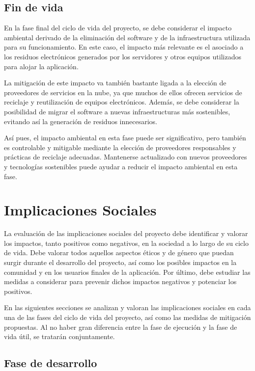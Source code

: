 \subsection{Fin de vida}

En la fase final del ciclo de vida del proyecto, se debe considerar el impacto ambiental derivado de la eliminación del software y de la infraestructura utilizada para su funcionamiento. En este caso, el impacto más relevante es el asociado a los residuos electrónicos generados por los servidores y otros equipos utilizados para alojar la aplicación.

La mitigación de este impacto va también bastante ligada a la elección de proveedores de servicios en la nube, ya que muchos de ellos ofrecen servicios de reciclaje y reutilización de equipos electrónicos. Además, se debe considerar la posibilidad de migrar el software a nuevas infraestructuras más sostenibles, evitando así la generación de residuos innecesarios.

Así pues, el impacto ambiental en esta fase puede ser significativo, pero también es controlable y mitigable mediante la elección de proveedores responsables y prácticas de reciclaje adecuadas. Mantenerse actualizado con nuevos proveedores y tecnologías sostenibles puede ayudar a reducir el impacto ambiental en esta fase.

\section{Implicaciones Sociales}
\label{as:sec:sociales}

La evaluación de las implicaciones sociales del proyecto debe identificar y valorar los impactos, tanto positivos como negativos, en la sociedad a lo largo de su ciclo de vida. Debe valorar todos aquellos aspectos éticos y de género que puedan surgir durante el desarrollo del proyecto, así como los posibles impactos en la comunidad y en los usuarios finales de la aplicación. Por último, debe estudiar las medidas a considerar para prevenir dichos impactos negativos y potenciar los positivos.

En las siguientes secciones se analizan y valoran las implicaciones sociales en cada una de las fases del ciclo de vida del proyecto, así como las medidas de mitigación propuestas. Al no haber gran diferencia entre la fase de ejecución y la fase de vida útil, se tratarán conjuntamente.

\subsection{Fase de desarrollo}


